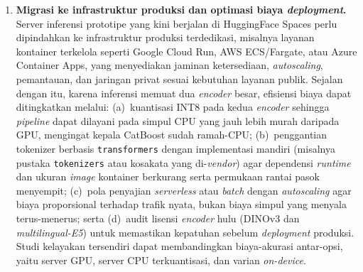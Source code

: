 \begin{enumerate}
    \item \textbf{Migrasi ke infrastruktur produksi dan optimasi biaya \textit{deployment}.} Server inferensi prototipe yang kini berjalan di HuggingFace Spaces perlu dipindahkan ke infrastruktur produksi terdedikasi, misalnya layanan kontainer terkelola seperti Google Cloud Run, AWS ECS/Fargate, atau Azure Container Apps, yang menyediakan jaminan ketersediaan, \textit{autoscaling}, pemantauan, dan jaringan privat sesuai kebutuhan layanan publik. Sejalan dengan itu, karena inferensi memuat dua \textit{encoder} besar, efisiensi biaya dapat ditingkatkan melalui: (a)~kuantisasi INT8 pada kedua \textit{encoder} sehingga \textit{pipeline} dapat dilayani pada simpul CPU yang jauh lebih murah daripada GPU, mengingat kepala CatBoost sudah ramah-CPU; (b)~penggantian tokenizer berbasis \texttt{transformers} dengan implementasi mandiri (misalnya pustaka \texttt{tokenizers} atau kosakata yang di-\textit{vendor}) agar dependensi \textit{runtime} dan ukuran \textit{image} kontainer berkurang serta permukaan rantai pasok menyempit; (c)~pola penyajian \textit{serverless} atau \textit{batch} dengan \textit{autoscaling} agar biaya proporsional terhadap trafik nyata, bukan biaya simpul yang menyala terus-menerus; serta (d)~audit lisensi \textit{encoder} hulu (DINOv3 dan \textit{multilingual-E5}) untuk memastikan kepatuhan sebelum \textit{deployment} produksi. Studi kelayakan tersendiri dapat membandingkan biaya-akurasi antar-opsi, yaitu server GPU, server CPU terkuantisasi, dan varian \textit{on-device}.
\end{enumerate}
